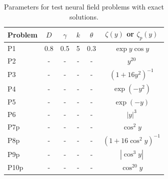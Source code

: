 \documentclass[a4paper,baskervaldx]{daarticle}
\newcommand{\otoprule}{\midrule[\heavyrulewidth]}
\begin{document}
\begin{table}
  \caption{Parameters for test neural field problems with exact solutions.}
  \label{tab:parameters}
  \centering
  \begin{tabular}{lccccc}
    \toprule
    Problem & $D$ & $\gamma$ & $k$ & $\theta$ & $\zeta(y)$ or $\zeta_p(y)$ \\
    \otoprule
    P1      &  0.8 &  0.5 &  5     & 0.3 & $ \exp{y} \cos y  $ \\
    P2      &  -   &  -   &  -     & -   & $ y^{20} $ \\
    P3      &  -   &  -   &  -     & -   & $ (1+16y^2)^{-1}$  \\
    P4      &  -   &  -   &  -     & -   & $ \exp (-y^2) $  \\
    P5      &  -   &  -   &  -     & -   & $ \exp (-y)$  \\
    P6      &  -   &  -   &  -     & -   & $ |y|^3 $  \\
    P7p     &  -   &  -   &  -     & -   & $ \cos^2 y $  \\
    P8p     &  -   &  -   &  -     & -   & $ (1+16 \cos^2 y)^{-1}$  \\
    P9p     &  -   &  -   &  -     & -   & $ |\cos^3 y|$  \\
    P10p    &  -   &  -   &  -     & -   & $ \cos^{20} y$ \\
    \bottomrule
  \end{tabular}
 \end{table}


\appendix

\end{document}
